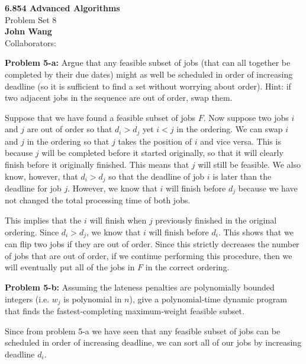 \documentclass[psamsfonts]{amsart}
\newenvironment{sol}{\vspace{0.25cm}{\large \bfseries Solution:}}{\qedsymbol}
\newenvironment{prob}[1]{\begin{framed}{\large \bfseries Problem #1:}}{\end{framed}}
\newcommand{\makenewtitle}{
    \begin{center}
    {\huge \bfseries 6.854 Advanced Algorithms} \\
    Problem Set 8\\
    \vspace{0.25cm}
    {\bfseries John Wang} \\
    Collaborators:  
    \end{center}
    \vspace{0.5cm}
}
\begin{document}
\newpage
\makenewtitle

\begin{prob}{5-a}
Argue that any feasible subset of jobs (that can all together be completed by their due dates) might as well be scheduled in order of increasing deadline (so it is sufficient to find a set without worrying about order). Hint: if two adjacent jobs in the sequence are out of order, swap them. 
\end{prob}
\begin{sol}
Suppose that we have found a feasible subset of jobs $F$. Now suppose two jobs $i$ and $j$ are out of order so that $d_i > d_j$ yet $i < j$ in the ordering. We can swap $i$ and $j$ in the ordering so that $j$ takes the position of $i$ and vice versa. This is because $j$ will be completed before it started originally, so that it will clearly finish before it originally finished. This means that $j$ will still be feasible. We also know, however, that $d_i > d_j$ so that the deadline of job $i$ is later than the deadline for job $j$. However, we know that $i$ will finish before $d_j$ because we have not changed the total processing time of both jobs. 

This implies that the $i$ will finish when $j$ previously finished in the original ordering. Since $d_i > d_j$, we know that $i$ will finish before $d_i$. This shows that we can flip two jobs if they are out of order. Since this strictly decreases the number of jobs that are out of order, if we continue performing this procedure, then we will eventually put all of the jobs in $F$ in the correct ordering. 
\end{sol}

\begin{prob}{5-b}
Assuming the lateness penalties are polynomially bounded integers (i.e. $w_j$ is polynomial in $n$), give a polynomial-time dynamic program that finds the fastest-completing maximum-weight feasible subset. 
\end{prob}
\begin{sol}
Since from problem 5-a we have seen that any feasible subset of jobs can be scheduled in order of increasing deadline, we can sort all of our jobs by increasing deadline $d_i$. 
\end{sol}
\end{document}
